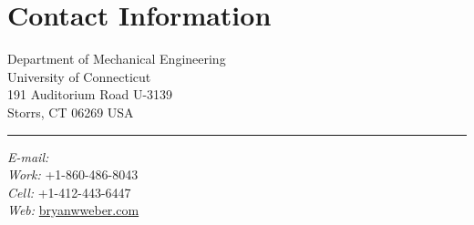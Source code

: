 
%
%
\setmainfont[Path = fonts/ ,
             Ligatures = TeX ,
             Extension = .otf ,
             BoldFont = Andada-Bold ,
             ItalicFont = Andada-Italic ,
             SmallCapsFont = AndadaSC-Regular
]
{Andada-Regular}
\newfontface{}
\newfontface{}



\vspace{1em}

\section{{\sectionfont Contact Information}}

%
\newlength{\rcolwidth}
\setlength{\rcolwidth}{2.5in}%
\newlength{\ccolwidth}
\setlength{\ccolwidth}{1pt}
\newlength{\lcolwidth}
\setlength{\lcolwidth}{\textwidth-\rcolwidth-\ccolwidth}
%
\begin{varwidth}{\lcolwidth}%
Department of Mechanical Engineering\\
University of Connecticut\\
191 Auditorium Road U-3139\\
Storrs, CT 06269 USA%
\end{varwidth}%
\hfill
\begin{varwidth}{\ccolwidth}
\rule{0.5pt}{4\baselineskip} %
\end{varwidth}%
\hfill
\begin{varwidth}{\rcolwidth}%
\textit{E-mail:} \\
\textit{Work:} +1-860-486-8043 \\
\textit{Cell:} +1-412-443-6447 \\
\textit{Web:} \href{http://bryanwweber.com}{bryanwweber.com}
\end{varwidth}%

